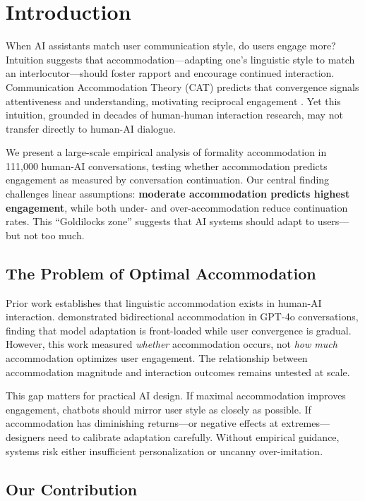 \section{Introduction}

When AI assistants match user communication style, do users engage more? Intuition suggests that accommodation---adapting one's linguistic style to match an interlocutor---should foster rapport and encourage continued interaction. Communication Accommodation Theory (CAT) predicts that convergence signals attentiveness and understanding, motivating reciprocal engagement \citep{giles1973accommodation}. Yet this intuition, grounded in decades of human-human interaction research, may not transfer directly to human-AI dialogue.

We present a large-scale empirical analysis of formality accommodation in 111,000 human-AI conversations, testing whether accommodation predicts engagement as measured by conversation continuation. Our central finding challenges linear assumptions: \textbf{moderate accommodation predicts highest engagement}, while both under- and over-accommodation reduce continuation rates. This ``Goldilocks zone'' suggests that AI systems should adapt to users---but not too much.

\subsection{The Problem of Optimal Accommodation}

Prior work establishes that linguistic accommodation exists in human-AI interaction. \citet{chen2026bidirectional} demonstrated bidirectional accommodation in GPT-4o conversations, finding that model adaptation is front-loaded while user convergence is gradual. However, this work measured \emph{whether} accommodation occurs, not \emph{how much} accommodation optimizes user engagement. The relationship between accommodation magnitude and interaction outcomes remains untested at scale.

This gap matters for practical AI design. If maximal accommodation improves engagement, chatbots should mirror user style as closely as possible. If accommodation has diminishing returns---or negative effects at extremes---designers need to calibrate adaptation carefully. Without empirical guidance, systems risk either insufficient personalization or uncanny over-imitation.

\subsection{Our Contribution}

